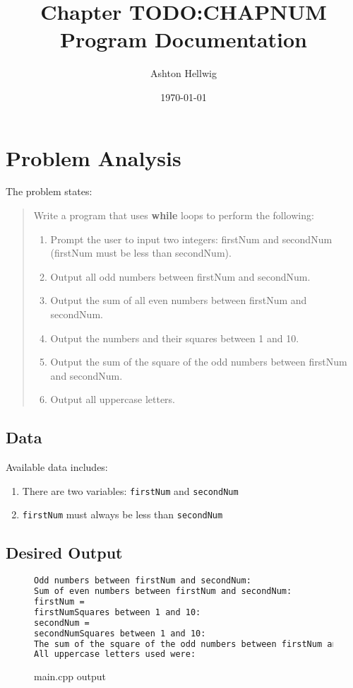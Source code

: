 \documentclass[a4paper,11pt]{article}
\title{Chapter TODO:CHAPNUM Program Documentation}
\author{Ashton Hellwig}
\date\today
\begin{document}
  \maketitle
  \tableofcontents
  \listoffigures
  \newpage


  \section{Problem Analysis}
    The problem states:
    \begin{quotation}
      Write a program that uses \textbf{while} loops to perform the following:
      \begin{enumerate}
        \item Prompt the user to input two integers: firstNum and secondNum
          (firstNum must be less than secondNum).
        \item Output all odd numbers between firstNum and secondNum.
        \item Output the sum of all even numbers between firstNum and secondNum.
        \item Output the numbers and their squares between 1 and 10.
        \item Output the sum of the square of the odd numbers between firstNum
          and secondNum.
        \item Output all uppercase letters.
      \end{enumerate}
    \end{quotation}

    \subsection{Data}
      Available data includes:
      \begin{enumerate}
        \item There are two variables: \texttt{firstNum} and \texttt{secondNum}
        \item \texttt{firstNum} must always be less than \texttt{secondNum}
      \end{enumerate}

    \subsection{Desired Output}
      \begin{figure}[h]
        \caption{main.cpp output}
        \begin{lstlisting}[language=bash]
Odd numbers between firstNum and secondNum:
Sum of even numbers between firstNum and secondNum:
firstNum =
firstNumSquares between 1 and 10: 
secondNum =
secondNumSquares between 1 and 10:
The sum of the square of the odd numbers between firstNum and secondNum =
All uppercase letters used were:
        \end{lstlisting}
        \label{fig:do}
      \end{figure}
\end{document}
